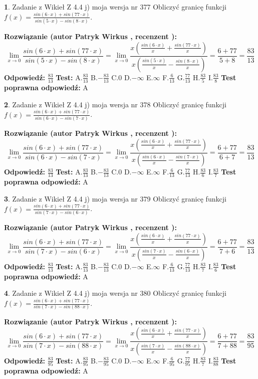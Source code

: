 \documentclass[12pt, a4paper]{article}
\theoremstyle{definition} %
\newtheorem{zad}{}
\newcommand{\zadStart}[1]{\begin{zad}#1\newline}
\newcommand{\zadStop}{\end{zad}}
\newcommand{\rozwStart}[2]{\noindent \textbf{Rozwiązanie (autor #1 , recenzent #2): }\newline}
\newcommand{\rozwStop}{\newline}
\newcommand{\odpStart}{\noindent \textbf{Odpowiedź:}\newline}
\newcommand{\odpStop}{\newline}
\newcommand{\testStart}{\noindent \textbf{Test:}\newline}
\newcommand{\testStop}{\newline}
\newcommand{\kluczStart}{\noindent \textbf{Test poprawna odpowiedź:}\newline}
\newcommand{\kluczStop}{\newline}
\begin{document}
\zadStart{Zadanie z Wikieł Z 4.4 j) moja wersja nr 377}
Obliczyć granicę funkcji $f(x)=\frac{sin(6\cdot x) +sin(77\cdot x)}{sin(5\cdot x) -sin(8\cdot x)}$.
\zadStop
\rozwStart{Patryk Wirkus}{}
$$\lim\limits_{x\to 0}\frac{sin(6\cdot x) +sin(77\cdot x)}{sin(5\cdot x) -sin(8\cdot x)}=\lim\limits_{x\to 0}\frac{x(\frac{sin(6\cdot x)}{x}+\frac{sin(77\cdot x)}{x})}{x(\frac{sin(5\cdot x)}{x}-\frac{sin(8\cdot x)}{x})}=\frac{6+77}{5+8} = \frac{83}{13}$$
\rozwStop
\odpStart
$\frac{83}{13}$
\odpStop
\testStart
A.$\frac{83}{13}$
B.$-\frac{83}{13}$
C.$0$
D.$-\infty$
E.$\infty$
F.$\frac{6}{13}$
G.$\frac{77}{13}$
H.$\frac{83}{5}$
I.$\frac{83}{8}$
\testStop
\kluczStart
A
\kluczStop



\zadStart{Zadanie z Wikieł Z 4.4 j) moja wersja nr 378}
Obliczyć granicę funkcji $f(x)=\frac{sin(6\cdot x) +sin(77\cdot x)}{sin(6\cdot x) -sin(7\cdot x)}$.
\zadStop
\rozwStart{Patryk Wirkus}{}
$$\lim\limits_{x\to 0}\frac{sin(6\cdot x) +sin(77\cdot x)}{sin(6\cdot x) -sin(7\cdot x)}=\lim\limits_{x\to 0}\frac{x(\frac{sin(6\cdot x)}{x}+\frac{sin(77\cdot x)}{x})}{x(\frac{sin(6\cdot x)}{x}-\frac{sin(7\cdot x)}{x})}=\frac{6+77}{6+7} = \frac{83}{13}$$
\rozwStop
\odpStart
$\frac{83}{13}$
\odpStop
\testStart
A.$\frac{83}{13}$
B.$-\frac{83}{13}$
C.$0$
D.$-\infty$
E.$\infty$
F.$\frac{6}{13}$
G.$\frac{77}{13}$
H.$\frac{83}{6}$
I.$\frac{83}{7}$
\testStop
\kluczStart
A
\kluczStop



\zadStart{Zadanie z Wikieł Z 4.4 j) moja wersja nr 379}
Obliczyć granicę funkcji $f(x)=\frac{sin(6\cdot x) +sin(77\cdot x)}{sin(7\cdot x) -sin(6\cdot x)}$.
\zadStop
\rozwStart{Patryk Wirkus}{}
$$\lim\limits_{x\to 0}\frac{sin(6\cdot x) +sin(77\cdot x)}{sin(7\cdot x) -sin(6\cdot x)}=\lim\limits_{x\to 0}\frac{x(\frac{sin(6\cdot x)}{x}+\frac{sin(77\cdot x)}{x})}{x(\frac{sin(7\cdot x)}{x}-\frac{sin(6\cdot x)}{x})}=\frac{6+77}{7+6} = \frac{83}{13}$$
\rozwStop
\odpStart
$\frac{83}{13}$
\odpStop
\testStart
A.$\frac{83}{13}$
B.$-\frac{83}{13}$
C.$0$
D.$-\infty$
E.$\infty$
F.$\frac{6}{13}$
G.$\frac{77}{13}$
H.$\frac{83}{7}$
I.$\frac{83}{6}$
\testStop
\kluczStart
A
\kluczStop



\zadStart{Zadanie z Wikieł Z 4.4 j) moja wersja nr 380}
Obliczyć granicę funkcji $f(x)=\frac{sin(6\cdot x) +sin(77\cdot x)}{sin(7\cdot x) -sin(88\cdot x)}$.
\zadStop
\rozwStart{Patryk Wirkus}{}
$$\lim\limits_{x\to 0}\frac{sin(6\cdot x) +sin(77\cdot x)}{sin(7\cdot x) -sin(88\cdot x)}=\lim\limits_{x\to 0}\frac{x(\frac{sin(6\cdot x)}{x}+\frac{sin(77\cdot x)}{x})}{x(\frac{sin(7\cdot x)}{x}-\frac{sin(88\cdot x)}{x})}=\frac{6+77}{7+88} = \frac{83}{95}$$
\rozwStop
\odpStart
$\frac{83}{95}$
\odpStop
\testStart
A.$\frac{83}{95}$
B.$-\frac{83}{95}$
C.$0$
D.$-\infty$
E.$\infty$
F.$\frac{6}{95}$
G.$\frac{77}{95}$
H.$\frac{83}{7}$
I.$\frac{83}{88}$
\testStop
\kluczStart
A
\kluczStop
\end{document}
